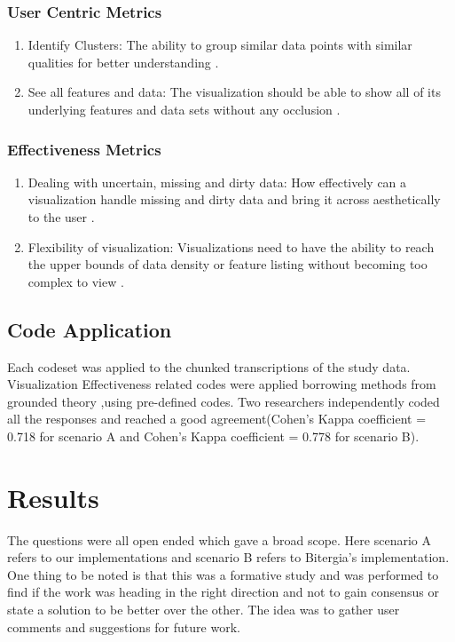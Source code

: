 \documentclass[double,12pt]{beavtex}
\begin{document}
\subsection{User Centric Metrics}

\begin{enumerate}
\item Identify Clusters: The ability to group similar data points with similar qualities for better understanding \cite{grins2001}.

\item See all features and data: The visualization should be able to show all of its underlying features and data sets without any occlusion \cite{grins2001}.
\end{enumerate}

\subsection{Effectiveness Metrics}

\begin{enumerate}
\item Dealing with uncertain, missing and dirty data: How effectively can a visualization handle missing and dirty data and bring it across aesthetically to the user \cite{grins2001}.

\item Flexibility of visualization: Visualizations need to have the ability to reach the upper bounds of data density or feature listing without becoming too complex to view \cite{grins2001}.
\end{enumerate}

\section{Code Application}
Each codeset was applied to the chunked transcriptions of the study data. Visualization Effectiveness related  codes  were  applied borrowing methods from  grounded theory \cite{corbin2008},using pre-­defined codes. Two researchers independently coded all the responses and reached a good agreement(Cohen’s  Kappa  coefficient  =  0.718 for scenario A and Cohen’s  Kappa  coefficient  =  0.778 for scenario B).

\chapter{Results}
The questions were all open ended which gave a broad scope. Here scenario A refers to our implementations and scenario B refers to Bitergia's implementation. One thing to be noted is that this was a formative study and was performed to find if the work was heading in the right direction and not to gain consensus or state a solution to be better over the other. The idea was to gather user comments and suggestions for future work.
\end{document}
